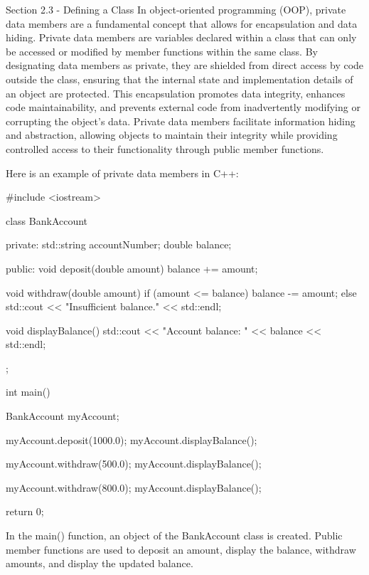 \begin{notes}{Section 2.3 - Defining a Class}
    In object-oriented programming (OOP), private data members are a fundamental concept that allows for encapsulation and data hiding. Private data members are variables declared within a class that can only be accessed or modified by member functions within the same class. 
    By designating data members as private, they are shielded from direct access by code outside the class, ensuring that the internal state and implementation details of an object are protected. This encapsulation promotes data integrity, enhances code maintainability, and 
    prevents external code from inadvertently modifying or corrupting the object's data. Private data members facilitate information hiding and abstraction, allowing objects to maintain their integrity while providing controlled access to their functionality through public 
    member functions.
    
    \begin{highlight}
        Here is an example of private data members in C++:
    \begin{code}[C++]
    #include <iostream>

    class BankAccount {
    private:
        std::string accountNumber;
        double balance;
        
    public:
        void deposit(double amount) {
            balance += amount;
        }
        
        void withdraw(double amount) {
            if (amount <= balance) {
                balance -= amount;
            } else {
                std::cout << "Insufficient balance." << std::endl;
            }
        }
        
        void displayBalance() {
            std::cout << "Account balance: " << balance << std::endl;
        }
    };
    
    int main() {
        BankAccount myAccount;
        
        myAccount.deposit(1000.0);
        myAccount.displayBalance();
        
        myAccount.withdraw(500.0);
        myAccount.displayBalance();
        
        myAccount.withdraw(800.0);
        myAccount.displayBalance();
        
        return 0;
    }
    \end{code}
        In the main() function, an object of the BankAccount class is created. Public member functions are used to deposit an amount, display the balance, withdraw amounts, and display the updated balance.
    

\end{highlight}
\end{notes}
